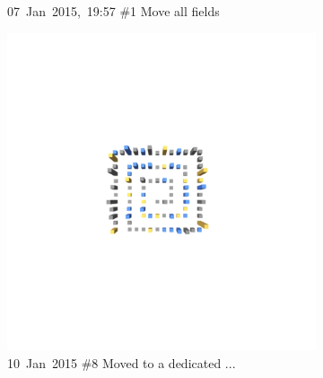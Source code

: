 \begin{figure}[ht]
\begin{subfigure}{0.32\textwidth}
        \caption{\mbox{07 Jan 2015, 19:57}  \hfill  \linebreak  \#1 Move all fields} 
        \label{fig:JetUML_V0S3}
    \end{subfigure}
    \hspace*{\fill}
    \medskip
    \begin{subfigure}{0.32\textwidth}
        \includegraphics[width=\linewidth]{JetUML_V0S4.png}
        \caption{\mbox{10 Jan 2015}  \hfill  \linebreak  \#8 Moved to a dedicated ...} 
        \label{fig:JetUML_V0S4}
    \end{subfigure}
    \hspace*{\fill}
    \begin{subfigure}{0.32\textwidth}

\end{subfigure}
\end{figure}
